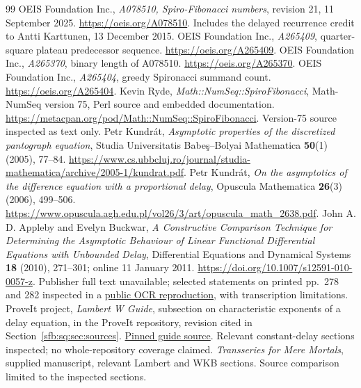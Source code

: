 \documentclass[11pt]{article}
\theoremstyle{remark}\newtheorem{remark}[theorem]{Remark}
\begin{document}
\begin{thebibliography}{99}
 OEIS Foundation Inc., \emph{A078510, Spiro-Fibonacci numbers}, revision 21, 11 September 2025. \url{https://oeis.org/A078510}. Includes the delayed recurrence credit to Antti Karttunen, 13 December 2015.
 OEIS Foundation Inc., \emph{A265409}, quarter-square plateau predecessor sequence. \url{https://oeis.org/A265409}.
 OEIS Foundation Inc., \emph{A265370}, binary length of A078510. \url{https://oeis.org/A265370}.
 OEIS Foundation Inc., \emph{A265404}, greedy Spironacci summand count. \url{https://oeis.org/A265404}.
 Kevin Ryde, \emph{Math::NumSeq::SpiroFibonacci}, Math-NumSeq version 75, Perl source and embedded documentation. \url{https://metacpan.org/pod/Math::NumSeq::SpiroFibonacci}. Version-75 source inspected as text only.
 Petr Kundr\'at, \emph{Asymptotic properties of the discretized pantograph equation}, Studia Universitatis Babe\c{s}--Bolyai Mathematica \textbf{50}(1) (2005), 77--84. \url{https://www.cs.ubbcluj.ro/journal/studia-mathematica/archive/2005-1/kundrat.pdf}.
 Petr Kundr\'at, \emph{On the asymptotics of the difference equation with a proportional delay}, Opuscula Mathematica \textbf{26}(3) (2006), 499--506. \url{https://www.opuscula.agh.edu.pl/vol26/3/art/opuscula_math_2638.pdf}.
 John A. D. Appleby and Evelyn Buckwar, \emph{A Constructive Comparison Technique for Determining the Asymptotic Behaviour of Linear Functional Differential Equations with Unbounded Delay}, Differential Equations and Dynamical Systems \textbf{18} (2010), 271--301; online 11 January 2011. \url{https://doi.org/10.1007/s12591-010-0057-z}. Publisher full text unavailable; selected statements on printed pp.~278 and 282 inspected in a \href{https://www.scribd.com/document/1006861920/Appleby-2010}{public OCR reproduction}, with transcription limitations.
 ProveIt project, \emph{Lambert W Guide}, subsection on characteristic exponents of a delay equation, in the ProveIt repository, revision cited in Section~\ref{sfb:sq:sec:sources}. \href{https://github.com/VladimirReshetnikov/ProveIt/blob/9ba11eaf7c1b6a27ccfc0bab63e22f97768cb704/Analysis/FabiusFunction/docs/semi-formalized-research-frontiers/drafts/lambert-w/Lambert_W_Guide/Lambert_W_Guide.tex}{Pinned guide source}. Relevant constant-delay sections inspected; no whole-repository coverage claimed.
 \emph{Transseries for Mere Mortals}, supplied manuscript, relevant Lambert and WKB sections. Source comparison limited to the inspected sections.

\end{thebibliography}
\end{document}
